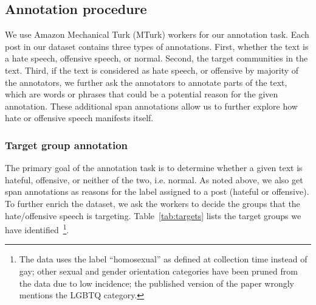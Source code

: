 \documentclass[letterpaper]{article} \usepackage{aaai21}  \usepackage{times}  \usepackage{helvet} \usepackage{courier}  \usepackage[hyphens]{url}  \usepackage{graphicx} \urlstyle{rm} \def\UrlFont{\rm}  \usepackage{natbib}  \usepackage{caption}
\begin{document}
\subsection{Annotation procedure}
We use Amazon Mechanical Turk (MTurk) workers for our annotation task. Each post in our dataset contains three types of annotations. First, whether the text is a hate speech, offensive speech, or normal. Second, the target communities in the text. Third, if the text is considered as hate speech, or offensive by majority of the annotators, we further ask the annotators to annotate parts of the text, which are words or phrases that could be a potential reason for the given annotation. These additional span annotations allow us to further explore how hate or offensive speech manifests itself.





\subsubsection{Target group annotation}
The primary goal of the annotation task is to determine whether a given text is hateful, offensive, or neither of the two, i.e. normal. As noted above, we also get span annotations as reasons for the label assigned to a post (hateful or offensive). To further enrich the dataset, we ask the workers to decide the groups that the hate/offensive speech is targeting. Table~\ref{tab:targets} lists the target groups we have identified~\footnote{The data uses the label ``homosexual'' as defined at collection time instead of gay; other sexual and gender orientation categories have been pruned from the data due to low incidence; the published version of the paper wrongly mentions the LGBTQ category.}.

\begin{table}[htbp]
\centering
{}
\caption{Target groups considered for the annotation.}
\label{tab:targets}
\end{table}
\end{document}
